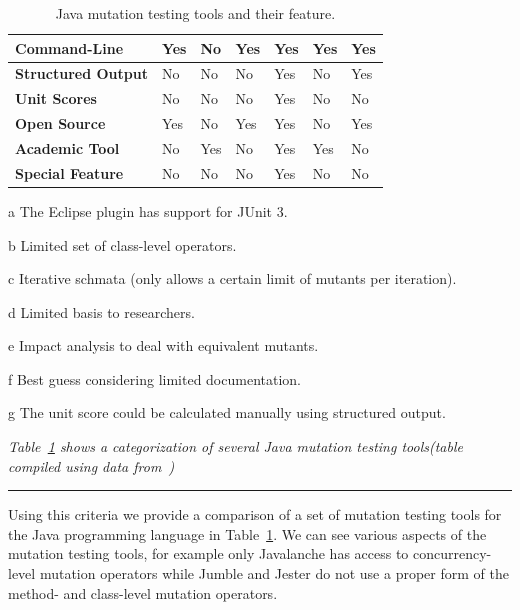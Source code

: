 \begin{landscape}
\begin{table}[ht!]
\begin{threeparttable}
\begin{tabular}{|l|l|l|l|l|l|l|}
        \hline \cellcolor[RGB]{169,196,223} \textbf{Command-Line} & Yes & No & Yes & Yes & Yes & Yes \\
        \hline \cellcolor[RGB]{169,196,223} \textbf{Structured Output} & No & No & No & Yes & No & Yes \\
        \hline \cellcolor[RGB]{169,196,223} \textbf{Unit Scores} & No & No & No & Yes & No & No\tnote{g} \\
        \hline \cellcolor[RGB]{169,196,223} \textbf{Open Source} & Yes & No\tnote{d} & Yes & Yes & No & Yes \\
        \hline \cellcolor[RGB]{169,196,223} \textbf{Academic Tool} & No & Yes & No & Yes & Yes & No \\
        \hline \cellcolor[RGB]{169,196,223} \textbf{Special Feature} & No & No & No & Yes\tnote{e} & No & No \\
        \hline
      \end{tabular}
      \begin{tablenotes}
        \item[a] The Eclipse plugin has support for JUnit 3.
        \item[b] Limited set of class-level operators.
        \item[c] Iterative schmata (only allows a certain limit of mutants per iteration).
        \item[d] Limited basis to researchers.
        \item[e] Impact analysis to deal with equivalent mutants.
        \item[f] Best guess considering limited documentation.
        \item[g] The unit score could be calculated manually using structured output.
      \end{tablenotes}
    \end{threeparttable}
    \caption{Java mutation testing tools and their feature.}
    \vspace{1mm}
    \footnotesize{\emph{Table~\ref{tab:mutation_tools} shows a categorization of several Java mutation testing tools(table compiled using data from~\cite{PIT, MR10})}}
    \vspace{2mm}
    \hrule
    \label{tab:mutation_tools}
  \end{table}
\end{landscape}

Using this criteria we provide a comparison of a set of mutation testing tools for the Java programming language in Table~\ref{tab:mutation_tools}. We can see various aspects of the mutation testing tools, for example only Javalanche has access to concurrency-level mutation operators while Jumble and Jester do not use a proper form of the method- and class-level mutation operators.


